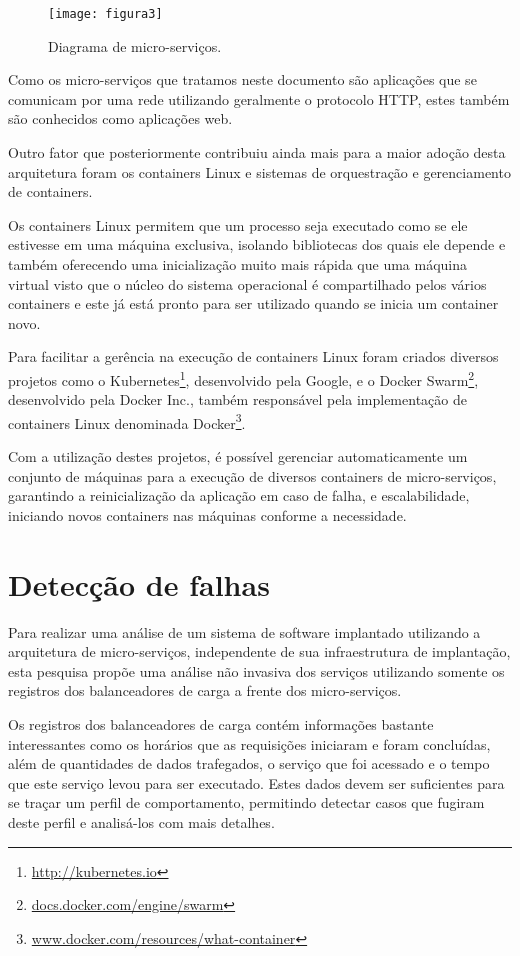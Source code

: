 \begin{figure}
  \centering
  \texttt{[image: figura3]}
  \caption{Diagrama de micro-serviços.\label{fig:diagrama-de-micro-servicos}}
\end{figure}

Como os micro-serviços que tratamos neste documento são aplicações que se
comunicam por uma rede utilizando geralmente o protocolo HTTP, estes também são
conhecidos como aplicações web.

Outro fator que posteriormente contribuiu ainda mais para a maior adoção desta
arquitetura foram os containers Linux e sistemas de orquestração e gerenciamento
de containers.

Os containers Linux permitem que um processo seja executado como se ele estivesse
em uma máquina exclusiva, isolando bibliotecas dos quais ele depende e também
oferecendo uma inicialização muito mais rápida que uma máquina virtual visto que
o núcleo do sistema operacional é compartilhado pelos vários containers e este já
está pronto para ser utilizado quando se inicia um container novo.

Para facilitar a gerência na execução de containers Linux foram criados diversos
projetos como o Kubernetes\footnote[4]{\url{http://kubernetes.io}}, desenvolvido
pela Google, e o Docker Swarm\footnote[5]{\url{docs.docker.com/engine/swarm}},
desenvolvido pela Docker Inc., também responsável pela implementação de
containers Linux denominada Docker\footnote[6]{\url{www.docker.com/resources/what-container}}.

Com a utilização destes projetos, é possível gerenciar automaticamente um conjunto
de máquinas para a execução de diversos containers de micro-serviços, garantindo
a reinicialização da aplicação em caso de falha, e escalabilidade, iniciando
novos containers nas máquinas conforme a necessidade.

\section{Detecção de falhas}
\label{sec:deteccao-de-falhas}

Para realizar uma análise de um sistema de software implantado utilizando a
arquitetura de micro-serviços, independente de sua infraestrutura de implantação,
esta pesquisa propõe uma análise não invasiva dos serviços utilizando somente os
registros dos balanceadores de carga a frente dos micro-serviços.

Os registros dos balanceadores de carga contém informações bastante interessantes
como os horários que as requisições iniciaram e foram concluídas, além de
quantidades de dados trafegados, o serviço que foi acessado e o tempo que este
serviço levou para ser executado. Estes dados devem ser suficientes para se
traçar um perfil de comportamento, permitindo detectar casos que fugiram deste
perfil e analisá-los com mais detalhes.

